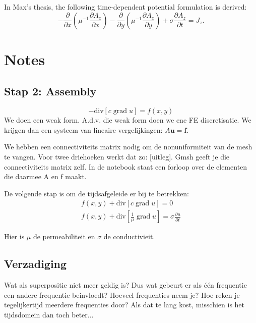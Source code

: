 

In Max's thesis, the following time-dependent potential formulation is derived:
\begin{equation}
    -\frac{\partial}{\partial x}\left(\mu^{-1} \frac{\partial A_z}{\partial x}\right) - \frac{\partial}{\partial y}\left(\mu^{-1} \frac{\partial A_z}{\partial y}\right) + \sigma \frac{\partial A_z}{\partial t} = J_z.
\end{equation}

\section{Notes}

\subsection*{Stap 2: Assembly}

\begin{equation*}
    -\text{div}\left[c \;\text{grad}\;u\right] = f(x, y)
\end{equation*}
We doen een weak form. A.d.v. die weak form doen we ene FE discretisatie. We krijgen dan een systeem van lineaire vergelijkingen: $A\mathbf{u} = \mathbf{f}$.

We hebben een connectiviteits matrix nodig om de nonuniformiteit van de mesh te vangen. Voor twee driehoeken werkt dat zo: [uitleg].
Gmsh geeft je die connectiviteits matrix zelf. In de notebook staat een forloop over de elementen die daarmee A en f maakt.

De volgende stap is om de tijdsafgeleide er bij te betrekken:
\begin{align*}
    f(x,y)+\text{div}\left[c \;\text{grad}\;u\right] = 0 \\
    f(x,y)+\text{div}\left[\frac{1}{\mu} \;\text{grad}\;u\right] = \sigma \frac{\partial u}{\partial t}
\end{align*}

Hier is $\mu$ de permeabiliteit en $\sigma$ de conductivieit.


\subsection{Verzadiging}
Wat als superpositie niet meer geldig is? Dus wat gebeurt er als één frequentie een andere frequentie beinvloedt? Hoeveel frequenties neem je? Hoe reken je tegelijkertijd meerdere frequenties door? Als dat te lang kost, misschien is het tijdsdomein dan toch beter...

